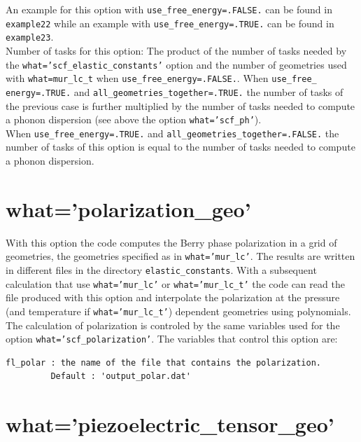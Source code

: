 \documentclass[12pt,a4paper,twoside]{report}
\begin{document}
An example for this option with \texttt{use\_free\_energy=.FALSE.}
can be found in \texttt{example22} while an example with
\texttt{use\_free\_energy=.TRUE.} can be found in \texttt{example23}. \\
Number of tasks for this option: The product of the number of tasks  
needed by the \texttt{what='scf\_elastic\_constants'} option 
and the number of geometries used with \texttt{what=mur\_lc\_t} when
\texttt{use\_free\_energy=.FALSE.}. When \texttt{use\_free\_}
\texttt{energy=.TRUE.}
and \texttt{all\_geometries\_together=.TRUE.} the number of tasks of the
previous case is further multiplied by the number of tasks needed to 
compute a phonon dispersion (see above the option \texttt{what='scf\_ph'}). \\
When \texttt{use\_free\_energy=.TRUE.} and 
\texttt{all\_geometries\_together=.FALSE.} the number of tasks of this
option is equal to the number of tasks needed to compute a phonon dispersion.

\newpage
{\color{coral}\section{what='polarization\_geo'}}
\color{black}

With this option the code computes the Berry phase polarization in a grid 
of geometries, the geometries specified as in \texttt{what='mur\_lc'}.
The results are written in different files in the directory 
\texttt{elastic\_constants}. With a subsequent calculation that
use \texttt{what='mur\_lc'} or \texttt{what='mur\_lc\_t'} the code
can read the file produced with this option and interpolate the
polarization at the pressure (and temperature if \texttt{what='mur\_lc\_t'})
dependent geometries using polynomials. 
The calculation of polarization is controled by the same variables used
for the option \texttt{what='scf\_polarization'}.
The variables that control this option are:
\begin{verbatim}
fl_polar : the name of the file that contains the polarization.
         Default : 'output_polar.dat'
\end{verbatim}


\newpage
{\color{coral}\section{what='piezoelectric\_tensor\_geo'}}
\color{black}
\end{document}
